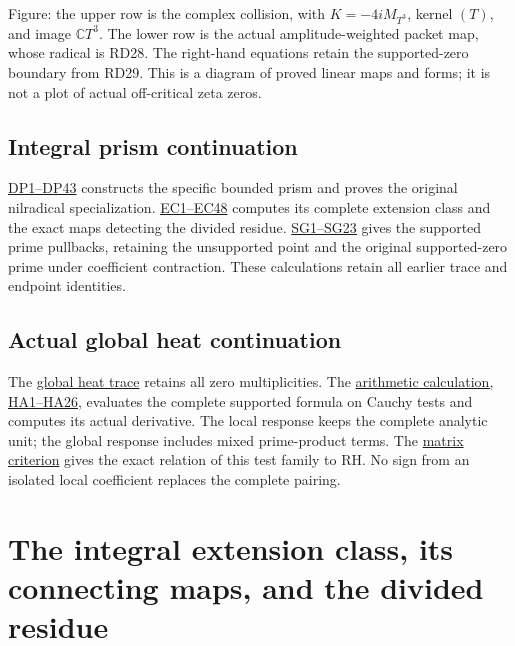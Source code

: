 \documentclass[
  10pt,
  a4paper,
]{article}
\begin{document}
Figure: the upper row is the complex collision, with \(K=-4iM_{T^3}\),
kernel \((T)\), and image \(\mathbb CT^3\). The lower row is the actual
amplitude-weighted packet map, whose radical is RD28. The right-hand
equations retain the supported-zero boundary from RD29. This is a
diagram of proved linear maps and forms; it is not a plot of actual
off-critical zeta zeros.

\subsection{Integral prism
continuation}\label{integral-prism-continuation-1}

\href{DISTINGUISHED_COLLISION_PRISM_DERIVATION.md}{DP1--DP43} constructs
the specific bounded prism and proves the original nilradical
specialization.
\href{NILRADICAL_COTANGENT_EXTENSION_CLASS_DERIVATION.md}{EC1--EC48}
computes its complete extension class and the exact maps detecting the
divided residue.
\href{SUPPORTED_PRISM_SPECTRUM_DERIVATION.md}{SG1--SG23} gives the
supported prime pullbacks, retaining the unsupported point and the
original supported-zero prime under coefficient contraction. These
calculations retain all earlier trace and endpoint identities.

\subsection{Actual global heat
continuation}\label{actual-global-heat-continuation-2}

The \href{ACTUAL_HEAT_ZERO_DISTRIBUTION_VARIATION.md}{global heat trace}
retains all zero multiplicities. The
\href{HEAT_CAUCHY_ARITHMETIC_DERIVATION.md}{arithmetic calculation,
HA1--HA26}, evaluates the complete supported formula on Cauchy tests and
computes its actual derivative. The local response keeps the complete
analytic unit; the global response includes mixed prime-product terms.
The \href{CAUCHY_WEIL_POSITIVITY_CRITERION.md}{matrix criterion} gives
the exact relation of this test family to RH. No sign from an isolated
local coefficient replaces the complete pairing.

\clearpage

\section{The integral extension class, its connecting maps, and the
divided
residue}\label{the-integral-extension-class-its-connecting-maps-and-the-divided-residue}
\end{document}
